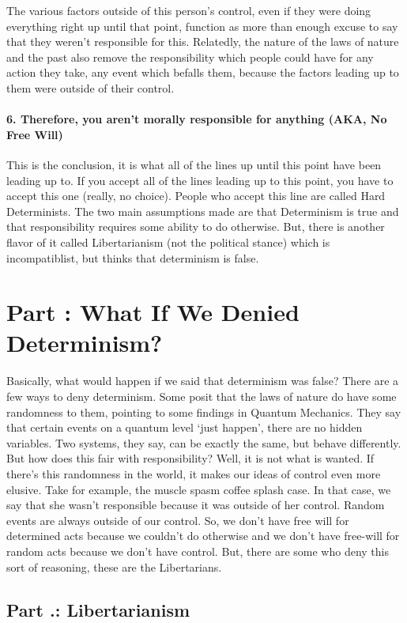  The various factors outside of this person's control, even if they were doing everything right up until that point, function as more than enough excuse to say that they weren't responsible for this. Relatedly, the nature of the laws of nature and the past also remove the responsibility which people could have for any action they take, any event which befalls them, because the factors leading up to them were outside of their control.
\subsubsection{6. Therefore, you aren't morally responsible for anything (AKA, No Free Will)}

This is the conclusion, it is what all of the lines up until this point have been leading up to. If you accept all of the lines leading up to this point, you have to accept this one (really, no choice).  People who accept this line are called Hard Determinists. The two main assumptions made are that Determinism is true and that responsibility requires some ability to do otherwise. But, there is another flavor of it called Libertarianism (not the political stance) which is incompatiblist, but thinks that determinism is false.
\chapter{Part \thechapcount: What If We Denied Determinism?}\setcounter{seccount}{1}
Basically, what would happen if we said that determinism was false? There are a few ways to deny determinism. Some posit that the laws of nature do have some randomness to them, pointing to some findings in Quantum Mechanics. They say that certain events on a quantum level ‘just happen’, there are no hidden variables. Two systems, they say, can be exactly the same, but behave differently. But how does this fair with responsibility? Well, it is not what is wanted. If there’s this randomness in the world, it makes our ideas of control even more elusive. Take for example, the muscle spasm coffee splash case. In that case, we say that she wasn't responsible because it was outside of her control. Random events are always outside of our control. So, we don't have free will for determined acts because we couldn't do otherwise and we don't have free-will for random acts because we don't have control.  But, there are some who deny this sort of reasoning, these are the Libertarians.

\section{Part \thechapcount.\theseccount: Libertarianism}

